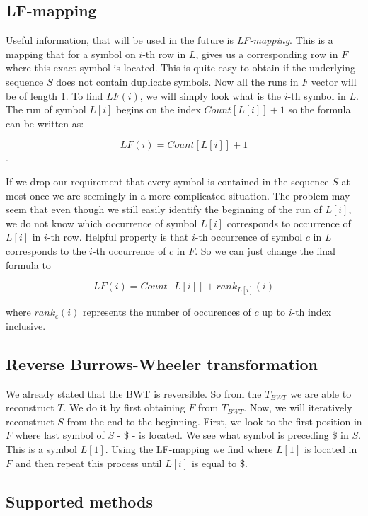 \subsection{LF-mapping}

Useful information, that will be used in the future is \textit{LF-mapping}.
This is a mapping that for a symbol on $i$-th row in $L$, gives us a corresponding row in $F$
where this exact symbol is located. This is quite easy to obtain if the underlying sequence $S$
does not contain duplicate symbols. Now all the runs in $F$ vector will be of length 1.
To find $LF(i)$, we will simply look what is the $i$-th symbol in $L$. The run of
symbol $L[i]$ begins on the index $Count[L[i]] + 1$ so the formula can be written as:

$$LF(i) = Count[L[i]] + 1$$.

If we drop our requirement that every symbol is contained in the sequence $S$ at most once
we are seemingly in a more complicated situation. The problem may seem that even
though we still easily identify the beginning of the run of $L[i]$, we do not
know which occurrence of symbol $L[i]$ corresponds to occurrence of $L[i]$ in $i$-th row.
Helpful property is that $i$-th occurrence of symbol $c$ in $L$ corresponds to the
$i$-th occurrence of $c$ in $F$. So we can just change the final formula to

				$$LF(i) = Count[L[i]] + rank_{L[i]}(i)$$

where $rank_c(i)$ represents the number of occurences of $c$ up to $i$-th index inclusive.

\subsection{Reverse Burrows-Wheeler transformation}

We already stated that the BWT is reversible. So from the $T_{BWT}$ we are able to reconstruct
$T$. We do it by first obtaining $F$ from $T_{BWT}$. Now, we will iteratively reconstruct $S$
from the end to the beginning. First, we look to the first position in $F$ where last symbol
of $S$ - \$ - is located. We see what symbol is preceding \$ in $S$. This is a symbol
$L[1]$. Using the LF-mapping we find where $L[1]$ is located in $F$ and then repeat this process
until $L[i]$ is equal to \$.

\subsection{Supported methods}

